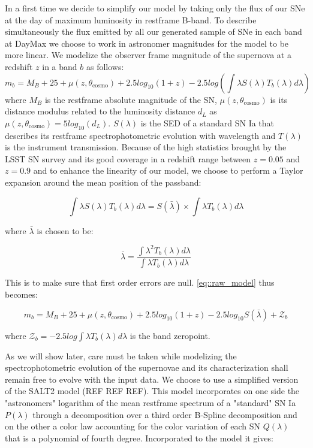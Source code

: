 \documentclass[\docopts]{\docclass}
\begin{document}
In a first time we decide to simplify our model by taking only the flux of our SNe at the day of maximum luminosity in restframe B-band.
To describe simultaneously the flux emitted by all our generated sample of SNe in each band at DayMax we choose to work in astronomer magnitudes for the model to be more linear.
We modelize the observer frame magnitude of the supernova at a redshift $z$ in a band $b$ as follows:
\begin{equation}
\label{eq::raw_model}
 m_b = M_B + 25 + \mu(z, \theta_\text{cosmo}) + 2.5log_{10}(1+z) - 2.5log(\int \lambda S(\lambda) T_b(\lambda) d\lambda) 
\end{equation}
where $M_B$ is the restframe absolute magnitude of the SN, $\mu(z, \theta_\text{cosmo})$ is its distance modulus related to the luminosity distance $d_L$ as $\mu(z, \theta_\text{cosmo}) = 5log_{10}(d_L)$.
$S(\lambda)$ is the SED of a standard SN Ia that describes its restframe spectrophotometric evolution with wavelength and $T(\lambda)$ is the instrument transmission.
Because of the high statistics brought by the LSST SN survey and its good coverage in a redshift range between $z=0.05$ and $z=0.9$ and to enhance the linearity of our model, we choose to perform a Taylor expansion around the mean position of the passband:

\begin{equation}
  \int \lambda S(\lambda) T_b(\lambda) d\lambda = S(\bar \lambda) \times \int \lambda T_b(\lambda) d\lambda
\end{equation}

where $\bar \lambda$ is chosen to be:

\begin{equation}
  \bar \lambda = \frac{\int \lambda^2 T_b(\lambda) d\lambda}{\int \lambda T_b(\lambda) d\lambda}
\end{equation}

This is to make sure that first order errors are null. \ref{eq::raw_model} thus becomes:
          
\begin{equation}
  m_b = M_B + 25 + \mu(z, \theta_\text{cosmo}) + 2.5log_{10}(1+z) - 2.5 log_{10} S(\bar \lambda) + \mathcal{Z}_b
\end{equation}

where $\mathcal{Z}_b = -2.5 log \int \lambda T_b(\lambda) d\lambda$ is the band zeropoint.

As we will show later, care must be taken while modelizing the spectrophotometric evolution of the supernovae and its characterization shall remain free to evolve with the input data.
We choose to use a simplified version of the SALT2 model (REF REF REF).
This model incorporates on one side the "astronomers" logarithm of the mean restframe spectrum of a "standard" SN Ia $P(\lambda)$ through a decomposition over a third order B-Spline decomposition and on the other a color law accounting for the color variation of each SN $Q(\lambda)$ that is a polynomial of fourth degree.
Incorporated to the model it gives:
\end{document}
